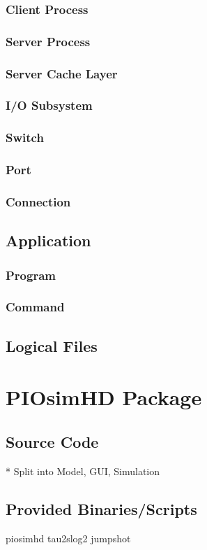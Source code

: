 \documentclass[
     11pt,         %
     a4paper,      %
     BCOR10mm,     %
     DIV14,        %
     liststotoc,   %
     bibtotoc,     %
     idxtotoc,     %
     parskip       %
     ]{scrreprt}   %
\begin{document}
\subsection{Client Process}
\subsection{Server Process}
\subsection{Server Cache Layer}
\subsection{I/O Subsystem}
\subsection{Switch}
\subsection{Port}
\subsection{Connection}

\section{Application}
\subsection{Program}
\subsection{Command}

\section{Logical Files}



\chapter{PIOsimHD Package}
\section{Source Code}
* Split into Model, GUI, Simulation
\section{Provided Binaries/Scripts} %
piosimhd
tau2slog2
jumpshot
\end{document}
